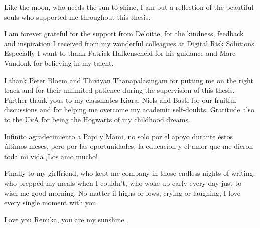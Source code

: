 Like the moon, who needs the sun to shine, I am but a reflection of the beautiful souls who supported me throughout this thesis.

I am forever grateful for the support from Deloitte, for the kindness, feedback and inspiration I received from my wonderful colleagues at Digital Risk Solutions. Especially I want to thank Patrick Hafkenscheid for his guidance and Marc Vandonk for believing in my talent.

I thank Peter Bloem and Thiviyan Thanapalasingam for putting me on the right track and for their unlimited patience during the supervision of this thesis. Further thank-yous to my classmates Kiara, Niels and Basti for our fruitful discussions and for helping me overcome my academic self-doubts. Gratitude also to the UvA for being the Hogwarts of my childhood dreams.

Infinito agradecimiento a Papi y Mami, no solo por el apoyo durante \'{e}stos \'{u}ltimos meses, pero por las oportunidades, la educac\'ion y el amor que me dieron toda mi vida ¡Los amo mucho!

Finally to my girlfriend, who kept me company in those endless nights of writing, who prepped my meals when I couldn't, who woke up early every day just to wish me good morning. 
No matter if highs or lows, crying or laughing, I love every single moment with you. 

\begin{center}
    Love you Renuka, you are my sunshine. \\\emojisun 
\end{center}